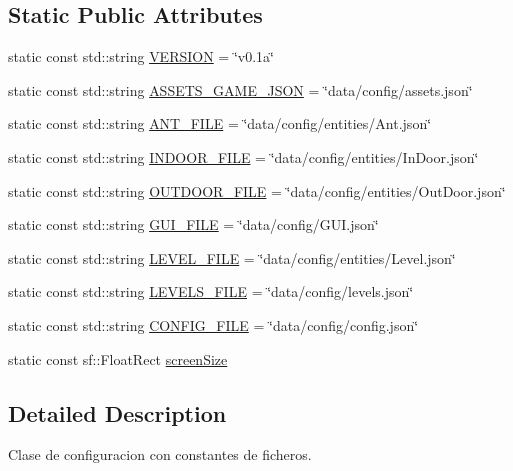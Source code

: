 \subsection*{Static Public Attributes}
\begin{DoxyCompactItemize}
\item 
static const std\+::string \hyperlink{classant_1_1_config_a9f3ed4719932faa38daf63c821959c0f}{V\+E\+R\+S\+I\+O\+N} = \char`\"{}v0.\+1a\char`\"{}
\item 
static const std\+::string \hyperlink{classant_1_1_config_a76f6edfa4ffe448ff6d874d438d59feb}{A\+S\+S\+E\+T\+S\+\_\+\+G\+A\+M\+E\+\_\+\+J\+S\+O\+N} = \char`\"{}data/config/assets.\+json\char`\"{}
\item 
static const std\+::string \hyperlink{classant_1_1_config_ab3a359a775f870b58cc8535aa44a6526}{A\+N\+T\+\_\+\+F\+I\+L\+E} = \char`\"{}data/config/entities/Ant.\+json\char`\"{}
\item 
static const std\+::string \hyperlink{classant_1_1_config_a8c82f237ce1b827e21ffc8640ee7240d}{I\+N\+D\+O\+O\+R\+\_\+\+F\+I\+L\+E} = \char`\"{}data/config/entities/In\+Door.\+json\char`\"{}
\item 
static const std\+::string \hyperlink{classant_1_1_config_aba26e65b1ef017af8e7e48eba3180acc}{O\+U\+T\+D\+O\+O\+R\+\_\+\+F\+I\+L\+E} = \char`\"{}data/config/entities/Out\+Door.\+json\char`\"{}
\item 
static const std\+::string \hyperlink{classant_1_1_config_a31e1640640b40078981101bae459f467}{G\+U\+I\+\_\+\+F\+I\+L\+E} = \char`\"{}data/config/G\+U\+I.\+json\char`\"{}
\item 
static const std\+::string \hyperlink{classant_1_1_config_a03d4a1c2b70dbe3d3877945b7c989858}{L\+E\+V\+E\+L\+\_\+\+F\+I\+L\+E} = \char`\"{}data/config/entities/Level.\+json\char`\"{}
\item 
static const std\+::string \hyperlink{classant_1_1_config_ad1f4e394b08d585a4047e3a4db7aeb90}{L\+E\+V\+E\+L\+S\+\_\+\+F\+I\+L\+E} = \char`\"{}data/config/levels.\+json\char`\"{}
\item 
static const std\+::string \hyperlink{classant_1_1_config_ab7eb789f0a5234e6b68cae2581276410}{C\+O\+N\+F\+I\+G\+\_\+\+F\+I\+L\+E} = \char`\"{}data/config/config.\+json\char`\"{}
\item 
static const sf\+::\+Float\+Rect \hyperlink{classant_1_1_config_a84b340cf79c14165c4960a4ea0ff56e0}{screen\+Size}
\end{DoxyCompactItemize}


\subsection{Detailed Description}
Clase de configuracion con constantes de ficheros. 

